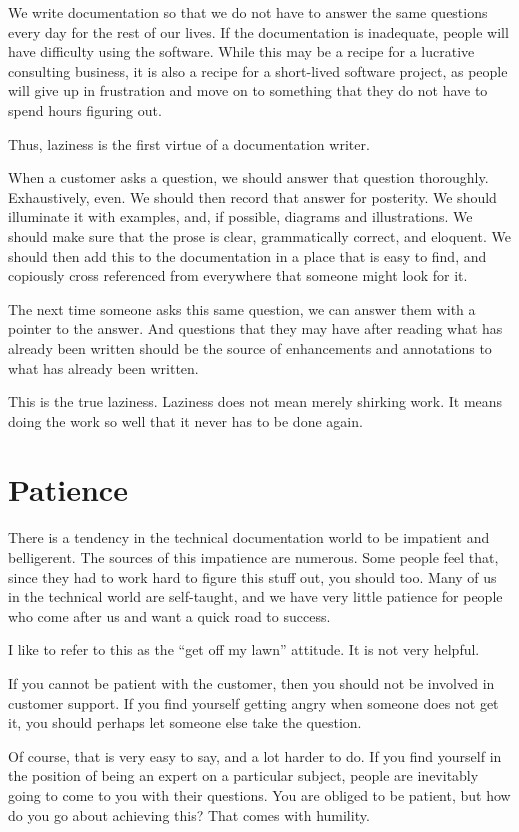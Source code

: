 We write documentation so that we do not have to answer the same questions every
day for the rest of our lives. If the documentation is inadequate, people will
have difficulty using the software. While this may be a recipe for a lucrative
consulting business, it is also a recipe for a short-lived software project, as
people will give up in frustration and move on to something that they do not
have to spend hours figuring out.

Thus, laziness is the first virtue of a documentation writer.

When a customer asks a question, we should answer that question thoroughly.
Exhaustively, even. We should then record that answer for posterity. We should
illuminate it with examples, and, if possible, diagrams and illustrations. We
should make sure that the prose is clear, grammatically correct, and eloquent.
We should then add this to the documentation in a place that is easy to find,
and copiously cross referenced from everywhere that someone might look for it.

The next time someone asks this same question, we can answer them with a pointer
to the answer. And questions that they may have after reading what has already
been written should be the source of enhancements and annotations to what has
already been written.

This is the true laziness. Laziness does not mean merely shirking work. It means
doing the work so well that it never has to be done again.

\section*{Patience}
There is a tendency in the technical documentation world to be impatient and
belligerent. The sources of this impatience are numerous. Some people feel that,
since they had to work hard to figure this stuff out, you should too. Many of us
in the technical world are self-taught, and we have very little patience for
people who come after us and want a quick road to success.

I like to refer to this as the ``get off my lawn'' attitude. It is not very
helpful.

If you cannot be patient with the customer, then you should not be involved in
customer support. If you find yourself getting angry when someone does not get
it, you should perhaps let someone else take the question.

Of course, that is very easy to say, and a lot harder to do. If you find
yourself in the position of being an expert on a particular subject, people are
inevitably going to come to you with their questions.
You are obliged to be patient, but how do you go about achieving this? That
comes with humility.

